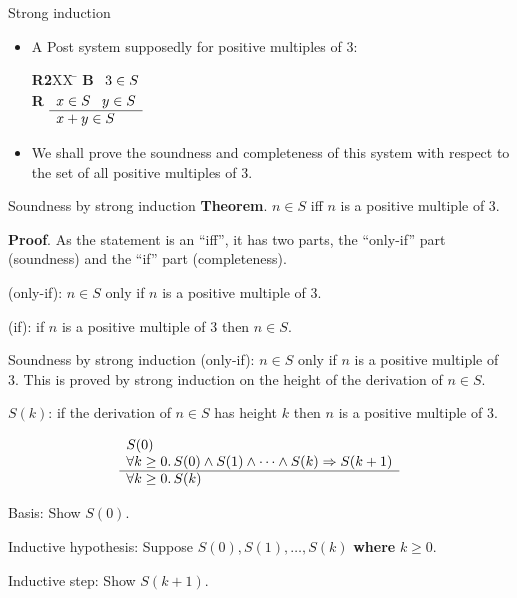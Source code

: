 \documentclass[style=sailor,size=12pt]{powerdot}
\begin{document}
\begin{wideslide}[bm=,toc=]{Strong induction}
\begin{itemize}
\item A Post system supposedly for positive multiples of 3:
\vspace{-1em}
\begin{tabbing}
{\bf R2}XX \=  \kill
{\bf B} \>
        \(\begin{array}[t]{l}
        3\in S
        \end{array}\) \\[2ex]
{\bf R} \>
        \(\begin{array}[t]{l}
        x \in S \;\;\;y \in S \\
        \hline
        x + y \in S
        \end{array}\)
\end{tabbing}
\item We shall prove the soundness and completeness of this system with respect to
the set of all positive multiples of 3.
\end{itemize}
\end{wideslide}

\begin{wideslide}[bm=,toc=]{Soundness by strong induction}
{\bf Theorem}. $n\in S$ iff $n$ is a positive multiple of 3.
\vspace{1em}

{\bf Proof}.  As the statement is an ``iff'', it has two parts, the ``only-if'' part (soundness)
and the ``if'' part (completeness).

\vspace{1em} 
(only-if): $n\in S$ only if $n$ is a positive multiple of 3.

\vspace{1em} 
(if): if $n$ is a positive multiple of 3 then $n\in S$. 
\end{wideslide}


\begin{wideslide}[bm=,toc=]{Soundness by strong induction}
(only-if): $n\in S$ only if $n$ is a positive multiple of 3.
This is proved by strong induction on the height of the derivation of $n\in S$.

\vspace{1em}
$S(k)$: if the derivation of $n\in S$ has height $k$ then $n$ is a positive multiple of 3.

\begin{displaymath}
\begin{array}[t]{l}
S(0) \\
\forall k\geq 0.\, S(0)\wedge S(1) \wedge \cdots \wedge S(k)\Rightarrow S(k+1) \\
\hline
\forall k\geq 0.\, S(k)
\end{array}
\end{displaymath}

\vspace{1em}
Basis: Show $S(0)$.

\vspace{1em}
Inductive hypothesis: Suppose $S(0), S(1),\ldots ,S(k)$ {\bf where} $k\geq 0$.

\vspace{1em}
Inductive step: Show $S(k+1)$.
\end{wideslide}
\end{document}
